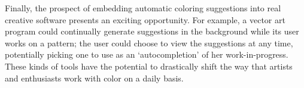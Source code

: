 Finally, the prospect of embedding automatic coloring suggestions into real creative software presents an exciting opportunity. For example, a vector art program could continually generate suggestions in the background while its user works on a pattern; the user could choose to view the suggestions at any time, potentially picking one to use as an `autocompletion' of her work-in-progress. These kinds of tools have the potential to drastically shift the way that artists and enthusiasts work with color on a daily basis. 